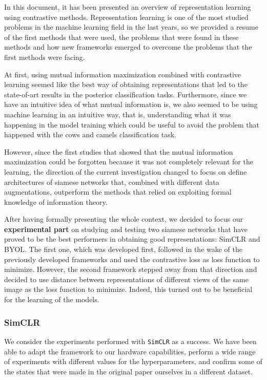 In this document, it has been presented an overview of representation learning using contrastive methods. Representation learning is one of the most studied problems in the machine learning field in the last years, so we provided a resume of the first methods that were used, the problems that were found in these methods and how new frameworks emerged to overcome the problems that the first methods were facing.

At first, using mutual information maximization combined with contrastive learning seemed like the best way of obtaining representations that led to the state-of-art results in the posterior classification tasks. Furthermore, since we have an intuitive idea of what mutual information is, we also seemed to be using machine learning in an intuitive way, that is, understanding what it was happening in the model training which could be useful to avoid the problem that happened with the cows and camels classification task.

However, since the first studies that showed that the mutual information maximization could be forgotten because it was not completely relevant for the learning, the direction of the current investigation changed to focus on define architectures of siamese networks that, combined with different data augmentations, outperform the methods that relied on exploiting formal knowledge of information theory.

After having formally presenting the whole  context, we decided to focus our \textbf{experimental part} on studying and testing two siamese networks that have proved to be the best performers in obtaining good representations: SimCLR and BYOL. The first one, which was developed first, followed in the wake of the previously developed frameworks and used the contrastive loss as loss function to minimize. However, the second framework stepped away from that direction and decided to use distance between representations of different views of the same image as the loss function to minimize. Indeed, this turned out to be beneficial for the learning of the models. 

\subsubsection*{SimCLR}

We consider the experiments performed with \lstinline{SimCLR} as a success. We have been able to adapt the framework to our hardware capabilities, perform a wide range of experiments with different values for the hyperparameters, and confirm some of the states that were made in the original paper ourselves in a different dataset.

